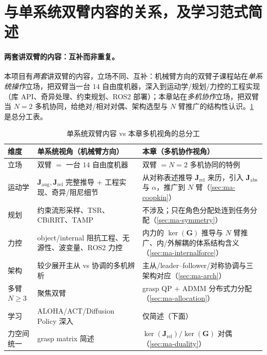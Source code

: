 \section{与单系统双臂内容的关系，及学习范式简述}
\label{sec:ma-boundary}

\paragraph{两套讲双臂的内容：互补而非重复。}
本项目有\emph{两套}讲双臂的内容，立场不同、互补：机械臂方向的双臂子课程站在\emph{单系统操作}立场，把双臂当一台 $14$ 自由度机器，深入到运动学/规划/力控的工程实现（库 API、奇异处理、约束规划、ROS2 部署）；本章站在\emph{多机协作}立场，把双臂当 $N=2$ 多机协同，给绝对/相对对偶、架构选型与 $N$ 臂推广的结构性认识。\cref{tab:ma-two-tracks} 是总分工表。

\begin{table}[H]\centering\small
\caption{单系统双臂内容 vs 本章多机视角的总分工}
\label{tab:ma-two-tracks}
\begin{tabular}{p{1.8cm}p{5.6cm}p{5.0cm}}
\toprule
维度 & 单系统视角（机械臂方向） & 本章（多机协作视角） \\
\midrule
立场 & 双臂 $=$ 一台 $14$ 自由度机器 & 双臂 $=N=2$ 多机协同的特例 \\
运动学 & $\mathbf{J}_{\text{aug}},\mathbf{J}_{\text{rel}}$ 完整推导 $+$ 工程实现、奇异/阻尼细节 & 从对称表述推导 $\mathbf{J}_{\text{rel}}$ 来历，引入 $\mathbf{J}_{\text{abs}}$ 与 $\alpha$，推广到 $N$ 臂（\cref{sec:ma-coopkin}） \\
规划 & 约束流形采样、TSR、CBiRRT、TAMP & 不涉及；只在角色分配处连到任务分配（\cref{sec:ma-symmetry}） \\
力控 & object/internal 阻抗工程、无源性、波变量、ROS2 力控 & 内力的 $\ker(\mathbf{G})$ 推导与 $N$ 臂推广、内/外解耦的体系结构含义（\cref{sec:ma-internalforce}） \\
架构 & 较少展开主从 vs 协调的多机辨析 & 主从/leader--follower/对称协调与三架构对应（\cref{sec:ma-arch}） \\
多臂 $N\ge3$ & 聚焦双臂 & grasp QP $+$ ADMM 分布式力分配（\cref{sec:ma-allocation}） \\
学习 & ALOHA/ACT/Diffusion Policy 深入 & 仅简述（下面） \\
力空间统一 & grasp matrix 简述 & $\ker(\mathbf{J}_{\text{rel}})/\ker(\mathbf{G})$ 对偶（\cref{sec:ma-duality}） \\
\bottomrule
\end{tabular}
\end{table}


